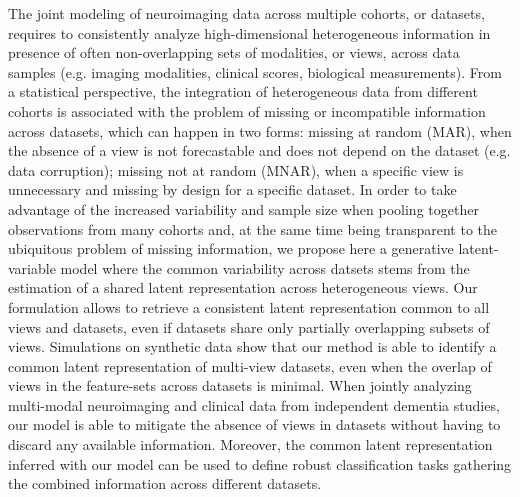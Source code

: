 The joint modeling of neuroimaging data across multiple cohorts, or datasets, requires to consistently analyze high-dimensional heterogeneous information in presence of often non-overlapping sets of modalities, or views, across data samples (e.g. imaging modalities, clinical scores, biological measurements).
From a statistical perspective, the integration of heterogeneous data from different cohorts is associated with the problem of missing or incompatible information across datasets, which can happen in two forms:
missing at random (MAR), when the absence of a view is not forecastable and does not depend on the dataset (e.g. data corruption);
missing not at random (MNAR), when a specific view is unnecessary and missing by design for a specific dataset.
%
In order to take advantage of the increased variability and sample size when pooling together observations from many cohorts
and, at the same time being transparent to the ubiquitous problem of missing information,
we propose here a generative latent-variable model where the common variability across datsets stems from the estimation of a shared latent representation across heterogeneous views.
Our formulation allows to retrieve a consistent latent representation common to all views and datasets, even if datasets share only partially overlapping subsets of views.
%
Simulations on synthetic data show that our method is able to identify a common latent representation of multi-view datasets, even when the overlap of views in the feature-sets across datasets is minimal.
%
When jointly analyzing multi-modal neuroimaging and clinical data from independent dementia studies, our model is able to mitigate the absence of views in datasets without having to discard any available information.
Moreover, the common latent representation inferred with our model can be used to define robust classification tasks gathering the combined information across different datasets.
